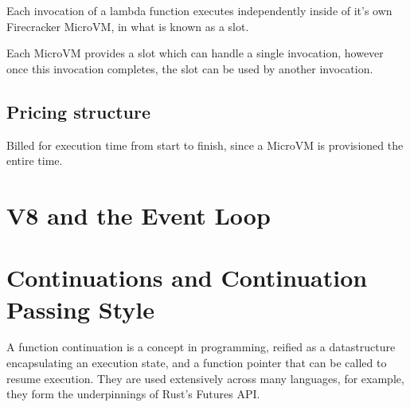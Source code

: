 Each invocation of a lambda function executes independently inside of it's own Firecracker MicroVM, in what is known as a slot.

Each MicroVM provides a slot which can handle a single invocation, however once this invocation completes, the slot can be used by another invocation.

\subsection{Pricing structure}

Billed for execution time from start to finish, since a MicroVM is provisioned the entire time.

\section{V8 and the Event Loop}
\label{sec:js-event-loop}


\section{Continuations and Continuation Passing Style}
A function continuation is a concept in programming\cite{sussmanSCHEMEInterpreterExtended1975}, reified as a datastructure encapsulating an execution state, and a function pointer that can be called to resume execution. They are used extensively across many languages, for example, they form the underpinnings of Rust's Futures API.
